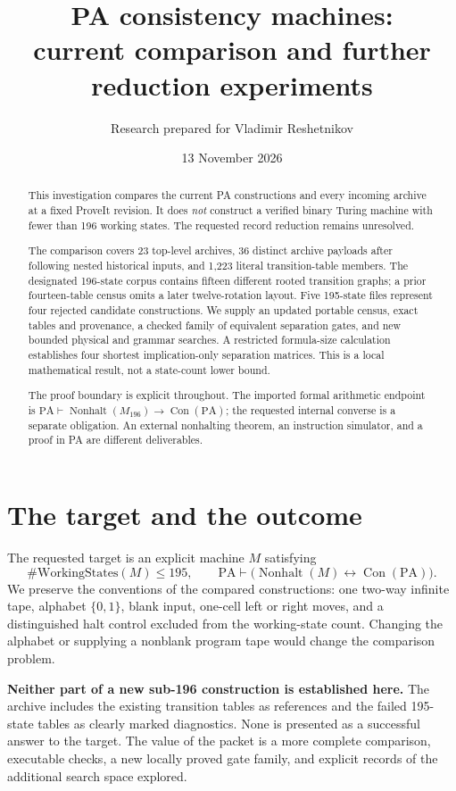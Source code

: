 \documentclass[11pt,letterpaper]{article}
\title{PA consistency machines:\\current comparison and further reduction experiments}
\author{Research prepared for Vladimir Reshetnikov}
\date{13 November 2026}
\newcommand{\PA}{\mathrm{PA}}
\newcommand{\Con}{\operatorname{Con}}
\newcommand{\Nonhalt}{\operatorname{Nonhalt}}
\newcommand{\imp}{\mathbin{\to}}
\begin{document}
\maketitle
\begin{abstract}
This investigation compares the current PA constructions and every incoming
archive at a fixed ProveIt revision. It does \emph{not} construct a verified
binary Turing machine with fewer than 196 working states. The requested
record reduction remains unresolved.

The comparison covers 23 top-level archives, 36 distinct archive payloads
after following nested historical inputs, and 1,223 literal transition-table
members. The designated 196-state corpus contains fifteen different rooted
transition graphs; a prior fourteen-table census omits a later twelve-rotation
layout. Five 195-state files represent four rejected candidate constructions.
We supply an updated portable census, exact tables and provenance, a checked
family of equivalent separation gates, and new bounded physical and grammar
searches. A restricted formula-size calculation establishes four shortest
implication-only separation matrices. This is a local mathematical result,
not a state-count lower bound.

The proof boundary is explicit throughout. The imported formal arithmetic
endpoint is $\PA\vdash\Nonhalt(M_{196})\imp\Con(\PA)$; the requested
internal converse is a separate obligation. An external nonhalting theorem,
an instruction simulator, and a proof in PA are different deliverables.
\end{abstract}

\tableofcontents
\clearpage

\section{The target and the outcome}

The requested target is an explicit machine $M$ satisfying
\[
 \#\mathrm{WorkingStates}(M)\leq 195,
 \qquad
 \PA\vdash \bigl(\Nonhalt(M)\leftrightarrow\Con(\PA)\bigr).
\]
We preserve the conventions of the compared constructions: one two-way
infinite tape, alphabet $\{0,1\}$, blank input, one-cell left or right moves,
and a distinguished halt control excluded from the working-state count.
Changing the alphabet or supplying a nonblank program tape would change
the comparison problem.

\textbf{Neither part of a new sub-196 construction is established here.}
The archive includes the existing transition tables as references and the
failed 195-state tables as clearly marked diagnostics. None is presented as
a successful answer to the target. The value of the packet is a more complete
comparison, executable checks, a new locally proved gate family, and explicit
records of the additional search space explored.
\end{document}
